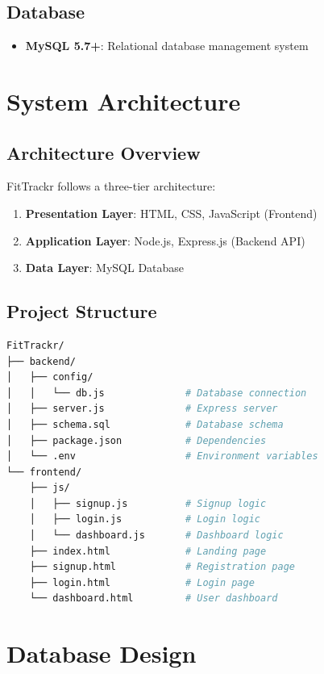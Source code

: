 \documentclass[12pt,a4paper]{article}
\begin{document}
\subsection{Database}
\begin{itemize}
    \item \textbf{MySQL 5.7+}: Relational database management system
\end{itemize}

\section{System Architecture}

\subsection{Architecture Overview}
FitTrackr follows a three-tier architecture:
\begin{enumerate}
    \item \textbf{Presentation Layer}: HTML, CSS, JavaScript (Frontend)
    \item \textbf{Application Layer}: Node.js, Express.js (Backend API)
    \item \textbf{Data Layer}: MySQL Database
\end{enumerate}

\subsection{Project Structure}
\begin{lstlisting}[language=bash]
FitTrackr/
├── backend/
│   ├── config/
│   │   └── db.js              # Database connection
│   ├── server.js              # Express server
│   ├── schema.sql             # Database schema
│   ├── package.json           # Dependencies
│   └── .env                   # Environment variables
└── frontend/
    ├── js/
    │   ├── signup.js          # Signup logic
    │   ├── login.js           # Login logic
    │   └── dashboard.js       # Dashboard logic
    ├── index.html             # Landing page
    ├── signup.html            # Registration page
    ├── login.html             # Login page
    └── dashboard.html         # User dashboard
\end{lstlisting}

\section{Database Design}
\end{document}

